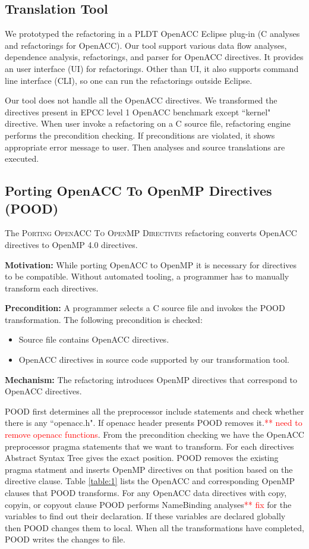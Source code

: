 \documentclass{sig-alternate-05-2015}
\newcommand\todo[1]{\textcolor{red}{** #1}}
\newcommand{\pooda}{\textsc{POOD}\xspace}
\newcommand{\pood}{\textsc{Porting OpenACC To OpenMP Directives}\xspace}
\begin{document}
\subsection{Translation Tool}
We prototyped the refactoring in a PLDT OpenACC Eclipse plug-in (C analyses and refactorings for OpenACC). Our tool support various data flow analyses, dependence analysis, refactorings, and parser for OpenACC directives. It provides an user interface (UI) for refactorings. Other than UI, it also supports command line interface (CLI), so one can run the refactorings outside Eclipse. 

Our tool does not handle all the OpenACC directives. We transformed the directives present in EPCC level 1 OpenACC benchmark except ``kernel" directive. When user invoke a refactoring on a C source file, refactoring engine performs the precondition checking. If preconditions are violated, it shows appropriate error message to user. Then analyses and source translations are executed.
  
\subsection{Porting OpenACC To OpenMP Directives (POOD)}
The \pood refactoring converts OpenACC directives to OpenMP 4.0 directives.

\textbf{Motivation:} While porting OpenACC to OpenMP it is necessary for directives to be compatible. Without automated tooling, a programmer has to manually transform each directives.

\textbf{Precondition:} A programmer selects a C source file and invokes the \pooda transformation. The following precondition is checked:

\begin{itemize}
\item Source file contains OpenACC directives.
\item OpenACC directives in source code supported by our transformation tool.
\end{itemize}  

\textbf{Mechanism:} The refactoring introduces OpenMP directives that correspond to OpenACC directives.

POOD first determines all the preprocessor include statements and check whether there is any ``openacc.h". If openacc header presents POOD removes it.\todo{need to remove openacc functions}. From the precondition checking we have the OpenACC preprocessor pragma statements that we want to transform. For each directives Abstract Syntax Tree gives the exact position. POOD removes the existing pragma statment and inserts OpenMP directives on that position based on the directive clause. Table \ref{table:1} lists the OpenACC and corresponding OpenMP clauses that POOD transforms. For any OpenACC data directives with copy, copyin, or copyout clause POOD performs NameBinding analyses\todo{fix} for the variables to find out their declaration. If these variables are declared globally then POOD changes them to local. When all the transformations have completed, POOD writes the changes to file.
\end{document}
